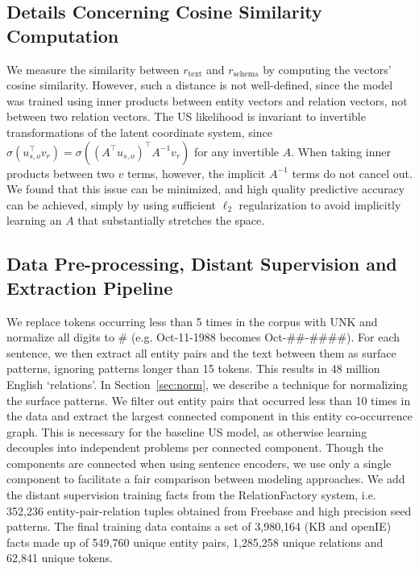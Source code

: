\subsection{Details Concerning Cosine Similarity Computation}
\label{app:cosine}
We measure the similarity between $r_{\text{text}}$ and $r_{\text{schema}}$ by computing the vectors' cosine similarity. However, such a distance is not well-defined, since the model was trained using inner products between entity vectors and relation vectors, not between two relation vectors. The US likelihood is invariant to invertible transformations of the latent coordinate system, since $\sigma\left( u_{s,o}^\top v_r \right) = \sigma\left( (A^\top u_{s,o})^\top A^{-1} v_r \right)$ for any invertible $A$. When taking inner products between two $v$ terms, however, the implicit $A^{-1}$ terms do not cancel out. We found that this issue can be minimized, and high quality predictive accuracy can be achieved, simply by using sufficient $\ell_2$ regularization to avoid implicitly learning an $A$ that substantially stretches the space.

\subsection{Data Pre-processing, Distant Supervision and Extraction Pipeline \label{sec:ds-el}}

We replace tokens occurring less than 5 times in the corpus with UNK and normalize all digits to \# (e.g. Oct-11-1988 becomes Oct-\#\#-\#\#\#\#).
For each sentence, we then extract all entity pairs and the text between them as surface patterns, ignoring patterns longer than 15 tokens.
This results in 48 million English `relations'. In Section~\ref{sec:norm}, we describe a technique for normalizing the surface patterns.
We filter out entity pairs that occurred less than 10 times in the data and extract the largest connected component in this entity co-occurrence graph.
This is necessary for the baseline US model, as otherwise learning decouples into independent problems per connected component.
Though the components are connected when using sentence encoders, we use only a single component to facilitate a fair comparison between modeling approaches.
We add the distant supervision training facts from the RelationFactory system, i.e. 352,236 entity-pair-relation tuples obtained from Freebase and high precision seed patterns.
The final training data contains a set of 3,980,164 (KB and openIE) facts made up of 549,760 unique entity pairs, 1,285,258 unique relations and 62,841 unique tokens.

